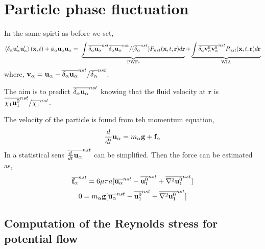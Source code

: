 \section*{Particle phase fluctuation}
In the same spirti as before we set, 
\begin{multline*}
    \left<\delta_\alpha \textbf{u}'_\alpha\textbf{u}'_\alpha\right>(\textbf{x},t)
    + \phi_\alpha \textbf{u}_\alpha\textbf{u}_\alpha
    = \
    \underbrace{\int \overline{\delta_\alpha \textbf{u}_\alpha}^{nst}  \overline{\delta_\alpha \textbf{u}_\alpha}^{nst} / (\overline{\delta_\alpha}^{nst})  P_{nst}(\textbf{x},t,\textbf{r}) d\textbf{r} }_\text{PWFs}
    +\underbrace{\int \overline{\delta_\alpha \textbf{v}_\alpha^0\textbf{v}_\alpha^0}^{nst}  P_{nst}(\textbf{x},t,\textbf{r}) d\textbf{r}}_\text{WIA}
\end{multline*}
where, $\textbf{v}_\alpha = \textbf{u}_\alpha - \overline{\delta_\alpha \textbf{u}_\alpha}^{nst}/\overline{\delta_\alpha}^{nst}$. 

The aim is to predict $\overline{\delta_\alpha \textbf{u}_\alpha}^{nst}$ knowing that the fluid velocity at $\textbf{r}$ is $\overline{\chi_1\textbf{u}^0_1}^{nst}/\overline{\chi_1}^{nst}$.

The velocity of the particle is found from teh momentum equation, 
\begin{equation*}
    \frac{d}{d t} \textbf{u}_\alpha
    = m_\alpha \textbf{g} + \textbf{f}_\alpha
\end{equation*}
In a statistical sens $\overline{\frac{d}{d t} \textbf{u}_\alpha}^{nst}$ can be simplified. 
Then the force can be estimated as,
\begin{equation*}
    \overline{\textbf{f}_\alpha}^{nst}
    = 6\mu \pi a 
    [\overline{\textbf{u}_\alpha}^{nst} - \overline{\textbf{u}^0_1}^{nst} + \overline{\mathbf{\nabla}^2 \textbf{u}_1^0}^{nst}]
\end{equation*}
\begin{equation*}
    0
    = m_\alpha \textbf{g} 
    [\overline{\textbf{u}_\alpha}^{nst} - \overline{\textbf{u}^0_1}^{nst} + \overline{\mathbf{\nabla}^2 \textbf{u}_1^0}^{nst}]
\end{equation*}


\subsection*{Computation of the Reynolds stress for potential flow }



